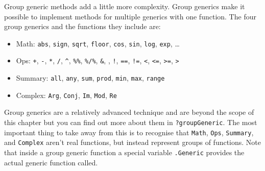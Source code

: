 \begin{Shaded}
\begin{Highlighting}[]
\StringTok{ }\NormalTok{(}\NormalTok{)}
\StringTok{ }
\StringTok{ }

\NormalTok{(}\NormalTok{(}\NormalTok{(), } \NormalTok{))}
\NormalTok{(}\NormalTok{(}\NormalTok{(), } \NormalTok{(}\NormalTok{, }\NormalTok{)))}
\NormalTok{(}\NormalTok{(}\NormalTok{(), } \NormalTok{))}
\end{Highlighting}
\end{Shaded}

Group generic methods add a little more complexity. Group generics make
it possible to implement methods for multiple generics with one
function. The four group generics and the functions they include are:
 

\begin{itemize}
\itemsep1pt\parskip0pt
\item
  Math: \texttt{abs}, \texttt{sign}, \texttt{sqrt}, \texttt{floor},
  \texttt{cos}, \texttt{sin}, \texttt{log}, \texttt{exp}, \ldots{}
\item
  Ops: \texttt{+}, \texttt{-}, \texttt{*}, \texttt{/}, \texttt{\^{}},
  \texttt{\%\%}, \texttt{\%/\%}, \texttt{\&}, \texttt{\textbar{}},
  \texttt{!}, \texttt{==}, \texttt{!=}, \texttt{\textless{}},
  \texttt{\textless{}=}, \texttt{\textgreater{}=},
  \texttt{\textgreater{}}
\item
  Summary: \texttt{all}, \texttt{any}, \texttt{sum}, \texttt{prod},
  \texttt{min}, \texttt{max}, \texttt{range}
\item
  Complex: \texttt{Arg}, \texttt{Conj}, \texttt{Im}, \texttt{Mod},
  \texttt{Re}
\end{itemize}

Group generics are a relatively advanced technique and are beyond the
scope of this chapter but you can find out more about them in
\texttt{?groupGeneric}. The most important thing to take away from this
is to recognise that \texttt{Math}, \texttt{Ops}, \texttt{Summary}, and
\texttt{Complex} aren't real functions, but instead represent groups of
functions. Note that inside a group generic function a special variable
\texttt{.Generic} provides the actual generic function called.

